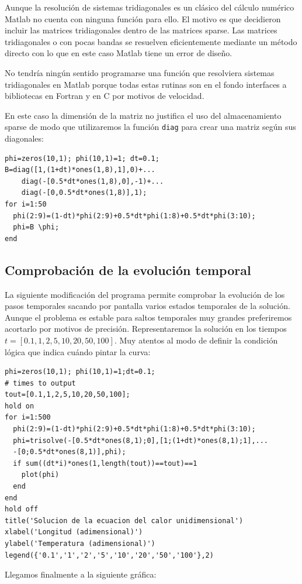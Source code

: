 Aunque la resolución de sistemas tridiagonales es un clásico del
cálculo numérico Matlab no cuenta con ninguna función para ello. El
motivo es que decidieron incluir las matrices tridiagonales dentro de
las matrices sparse. Las matrices tridiagonales o con pocas bandas se
resuelven eficientemente mediante un método directo con lo que en este
caso Matlab tiene un error de diseño.

No tendría ningún sentido programarse una función que resolviera
sistemas tridiagonales en Matlab porque todas estas rutinas son en el
fondo interfaces a bibliotecas en Fortran y en C por motivos de
velocidad.

En este caso la dimensión de la matriz no justifica el uso del
almacenamiento sparse de modo que utilizaremos la función
\texttt{diag} para crear una matriz según sus diagonales:

\begin{verbatim}
phi=zeros(10,1); phi(10,1)=1; dt=0.1;
B=diag([1,(1+dt)*ones(1,8),1],0)+...
    diag(-[0.5*dt*ones(1,8),0],-1)+...
    diag(-[0,0.5*dt*ones(1,8)],1);
for i=1:50
  phi(2:9)=(1-dt)*phi(2:9)+0.5*dt*phi(1:8)+0.5*dt*phi(3:10);
  phi=B \phi;
end
\end{verbatim}

\subsection{Comprobación de la evolución temporal}

La siguiente modificación del programa permite comprobar la evolución
de los pasos temporales sacando por pantalla varios estados temporales
de la solución. Aunque el problema es estable para saltos temporales
muy grandes preferiremos acortarlo por motivos de precisión.
Representaremos la solución en los tiempos
$t=[0.1,1,2,5,10,20,50,100]$. Muy atentos al modo de definir la
condición lógica que indica cuándo pintar la curva:

\begin{verbatim}
phi=zeros(10,1); phi(10,1)=1;dt=0.1;
# times to output
tout=[0.1,1,2,5,10,20,50,100];
hold on
for i=1:500 
  phi(2:9)=(1-dt)*phi(2:9)+0.5*dt*phi(1:8)+0.5*dt*phi(3:10);
  phi=trisolve(-[0.5*dt*ones(8,1);0],[1;(1+dt)*ones(8,1);1],...
  -[0;0.5*dt*ones(8,1)],phi);
  if sum((dt*i)*ones(1,length(tout))==tout)==1
    plot(phi)
  end
end
hold off
title('Solucion de la ecuacion del calor unidimensional')
xlabel('Longitud (adimensional)')
ylabel('Temperatura (adimensional)')
legend({'0.1','1','2','5','10','20','50','100'},2)
\end{verbatim}
Llegamos finalmente a la siguiente gráfica:

